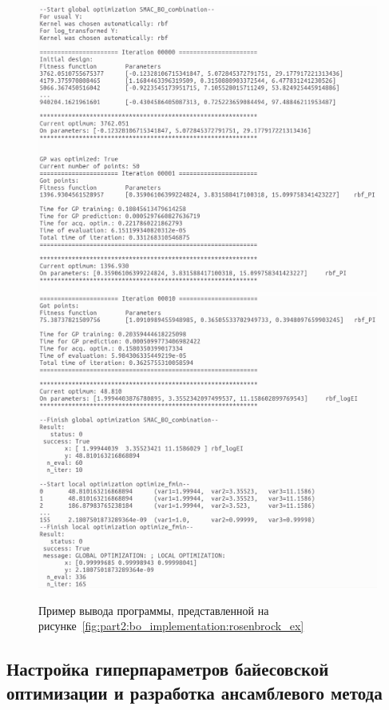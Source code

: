 \begin{figure}[ht]
    \centering
    \includegraphics[width=0.85\linewidth]{images/part2/bayesian_optimization/bo_output.png}
    \includegraphics[width=0.85\linewidth]{images/part2/bayesian_optimization/ls_bo_output.png}
    \caption{Пример вывода программы, представленной на рисунке~\ref{fig:part2:bo_implementation:rosenbrock_ex}}
    \label{fig:part2:bo_implementation:rosenbrock_out}
\end{figure}

\FloatBarrier
\subsection{Настройка гиперпараметров байесовской оптимизации и разработка ансамблевого метода}
\label{sec:part2:bayesian_optimization:overview}

